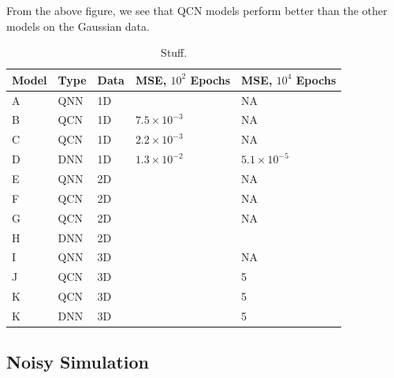 From the above figure, we see that QCN models perform better than the other models on the Gaussian data. 
\begin{table}[H]
\centering
\begin{tabular}{|l|l|l|l|l|}
\hline
Model& Type& Data& MSE, $10^{2}$ Epochs& MSE, $10^{4}$ Epochs \\ \hline
A    & QNN & 1D  &    & NA   \\ \hline
B    & QCN & 1D  & $7.5\times 10^{-3}$  & NA \\ \hline
C    & QCN & 1D  & $2.2\times 10^{-3}$  & NA  \\ \hline
D    & DNN & 1D  & $1.3\times 10^{-2}$ & $5.1\times 10^{-5}$  \\ \Xhline{2\arrayrulewidth}
E    & QNN & 2D  &                    & NA  \\ \hline
F    & QCN & 2D  &                    & NA  \\ \hline
G    & QCN & 2D  &                    & NA  \\ \hline
H    & DNN & 2D  &                    &   \\ \Xhline{2\arrayrulewidth}
I    & QNN & 3D  &                    & NA  \\ \hline
J    & QCN & 3D  &                    & 5  \\ \hline
K    & QCN & 3D  &                    & 5  \\ \hline
K    & DNN & 3D  &                    & 5  \\ \hline
\end{tabular}
\caption{Stuff.} 
\label{tab:training models}
\end{table}

\subsection{Noisy Simulation}\label{sec:Noisy Simulation}

